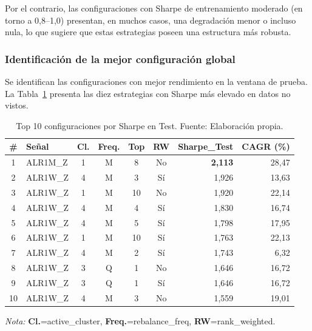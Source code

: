 Por el contrario, las configuraciones con Sharpe de entrenamiento
moderado (en torno a 0,8--1,0) presentan, en muchos casos, una
degradación menor o incluso nula, lo que sugiere que estas
estrategias poseen una estructura más robusta.

\subsubsection{Identificación de la mejor configuración global}

Se identifican las
configuraciones con mejor rendimiento en la ventana de prueba.
La Tabla~\ref{tab:top10_oos} presenta las diez estrategias con
Sharpe más elevado en datos no vistos.

\begin{table}[H]
\centering
\small
\begin{tabular}{clccccrr}
\toprule
\textbf{\#} & \textbf{Señal} & \textbf{Cl.} & \textbf{Freq.} & \textbf{Top} &
\textbf{RW} & \textbf{Sharpe\_Test} & \textbf{CAGR (\%)} \\
\midrule
1  & ALR1M\_Z    & 1 & M  & 8  & No  & \textbf{2,113} & 28,47 \\
2  & ALR1W\_Z    & 4 & M  & 3  & Sí  & 1,926         & 13,63 \\
3  & ALR1W\_Z    & 1 & M  & 10 & No  & 1,920         & 22,14 \\
4  & ALR1W\_Z    & 4 & M  & 4  & Sí  & 1,830         & 16,74 \\
5  & ALR1W\_Z    & 4 & M  & 5  & Sí  & 1,798         & 17,95 \\
6  & ALR1W\_Z    & 1 & M  & 10 & Sí  & 1,763         & 22,13 \\
7  & ALR1W\_Z    & 4 & M  & 2  & Sí  & 1,743         & 6,32  \\
8  & ALR1W\_Z    & 3 & Q  & 1  & No  & 1,646         & 16,72 \\
9  & ALR1W\_Z    & 3 & Q  & 1  & Sí  & 1,646         & 16,72 \\
10 & ALR1W\_Z    & 4 & M  & 3  & No  & 1,559         & 19,01 \\
\bottomrule
\end{tabular}
\caption{Top 10 configuraciones por Sharpe en Test.
Fuente: Elaboración propia.}
\label{tab:top10_oos}
\begin{flushleft}
\small \textit{Nota:} \textbf{Cl.}=active\_cluster,
\textbf{Freq.}=rebalance\_freq, \textbf{RW}=rank\_weighted.
\end{flushleft}
\end{table}

